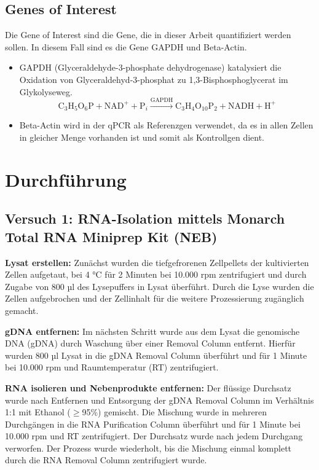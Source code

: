 \documentclass{article}
\begin{document}
\subsection*{Genes of Interest}
Die Gene of Interest sind die Gene, die in dieser Arbeit quantifiziert
werden sollen. In diesem Fall sind es die Gene GAPDH und Beta-Actin.
\begin{itemize}
    \item GAPDH (Glyceraldehyde-3-phosphate dehydrogenase) katalysiert die 
    Oxidation von Glyceraldehyd-3-phosphat zu
    1,3-Bisphosphoglycerat im Glykolyseweg.
\[
\text{C}_3\text{H}_5\text{O}_6\text{P} + \text{NAD}^+ + \text{P}_i \xrightarrow{\text{GAPDH}} \text{C}_3\text{H}_4\text{O}_{10}\text{P}_2 + \text{NADH} + \text{H}^+
\]

    \item Beta-Actin wird in der qPCR als Referenzgen verwendet, da es in allen
    Zellen in gleicher Menge vorhanden ist und somit als Kontrollgen dient.
    
\end{itemize}


\section*{Durchführung}

\subsection*{Versuch 1: RNA-Isolation mittels Monarch\textsuperscript{\textregistered} Total RNA Miniprep Kit (NEB)}

\textbf{Lysat erstellen:}
Zunächst wurden die tiefgefrorenen Zellpellets der kultivierten Zellen aufgetaut, bei 4 °C für 2 Minuten bei 10.000 rpm zentrifugiert und durch Zugabe von 800 µl des Lysepuffers in Lysat überführt. Durch die Lyse wurden die Zellen aufgebrochen und der Zellinhalt für die weitere Prozessierung zugänglich gemacht.

\textbf{gDNA entfernen:}
Im nächsten Schritt wurde aus dem Lysat die genomische DNA (gDNA) durch Waschung über einer Removal Column entfernt. Hierfür wurden 800 µl Lysat in die gDNA Removal Column überführt und für 1 Minute bei 10.000 rpm und Raumtemperatur (RT) zentrifugiert.

\textbf{RNA isolieren und Nebenprodukte entfernen:}
Der flüssige Durchsatz wurde nach Entfernen und Entsorgung der gDNA Removal Column im Verhältnis 1:1 mit Ethanol (\(\geq\)95\%) gemischt. Die Mischung wurde in mehreren Durchgängen in die RNA Purification Column überführt und für 1 Minute bei 10.000 rpm und RT zentrifugiert. Der Durchsatz wurde nach jedem Durchgang verworfen. Der Prozess wurde wiederholt, bis die Mischung einmal komplett durch die RNA Removal Column zentrifugiert wurde.
\end{document}
